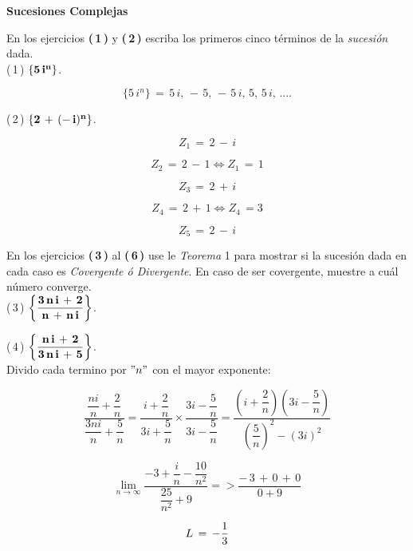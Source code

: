 \documentclass[a4paper,11pt,openany]{book}
\begin{document}
\newpage




\begin{center}
\textbf{Sucesiones Complejas}
\end{center}

En los ejercicios \textbf{(\,1\,)} y \textbf{(\,2\,)} escriba los primeros cinco términos de la {\it sucesión} dada.\\

\textcolor{ao(english)}{(\,1\,)} $\bf{\{5\,i^{n}\}}$.

$$\{5\,i^{n}\}\,=\,5\,i,\,-\,5,\,-\,5\,i,\,5,\,5\,i,\,....$$

\textcolor{ao(english)}{(\,2\,)} $\bf{\{2\,+\,(-\,i)^{n}\}}$.

$$ Z_{1}\,=\,2\,-\,i $$

$$ Z_{2}\,=\,2\,-\,1 \iff Z_{1}\,=\,1  $$

$$ Z_{3}\,=\,2\,+\,i $$

$$ Z_{4}\,=\,2\,+\,1 \iff Z_{4}\,= 3$$

$$ Z_{5}\,=\,2\,-\,i $$

En los ejercicios \textbf{(\,3\,)} al \textbf{(\,6\,)} use le \textcolor{mediumviolet-red}{{\it Teorema} 1} para mostrar si la sucesión dada en cada caso es {\it Covergente ó Divergente}. En caso de ser covergente, muestre a cuál número converge.\\

\textcolor{ao(english)}{(\,3\,)} $\bf{\left\{\dfrac{3\,n\,i\,+\,2}{n\,+\,n\,i}\right\}}$.

\textcolor{ao(english)}{(\,4\,)} $\bf{\left\{\dfrac{n\,i\,+\,2}{3\,n\,i\,+\,5}\right\}}$.\\

 Divido cada termino por $"n"$ con el mayor exponente:
 
 $$\dfrac{\dfrac{n i}{n}+\dfrac{2}{n}}{\dfrac{3n i}{n}+\dfrac{5}{n}} = \dfrac{i+\dfrac{2}{n}}{3i+\dfrac{5}{n}} \times \dfrac{3i-\dfrac{5}{n}}{3i-\dfrac{5}{n}} = \dfrac{\left(i+ \dfrac{2}{n} \right) \left(3i- \dfrac{5}{n} \right)}{ \left( \dfrac{5}{n} \right)^{2} - (3i)^{2} } $$
 
 $$\displaystyle\lim_{n \to \infty} \dfrac{-3+\dfrac{i}{n}-\dfrac{10}{n^{2}}}{\dfrac{25}{n^{2}}+9} => \dfrac{-\,3\,+\,0\,+\,0}{0 +9} $$
 
 $$\mathnormal{L}\,=\,-\dfrac{1}{3}$$
\end{document}
